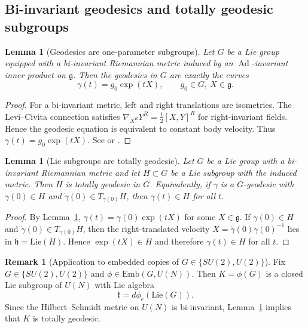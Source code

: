 \documentclass{article}%
\newtheorem{lemma}[theorem]{Lemma}
\theoremstyle{definition}
\newtheorem{remark}[theorem]{Remark}
\numberwithin{equation}{section}
\newcommand{\Emb}{\mathrm{Emb}}
\newcommand{\Lie}{\mathrm{Lie}}
\DeclareMathOperator{\Ad}{Ad}
\begin{document}
\subsection{Bi-invariant geodesics and totally geodesic subgroups}
\label{subsec:geodesics_and_totally_geodesic}

\begin{lemma}[Geodesics are one-parameter subgroups]\label{lem:geodesics_one_parameter}
Let $G$ be a Lie group equipped with a bi-invariant Riemannian metric induced by an $\Ad$-invariant inner product on $\mathfrak g$.
Then the geodesics in $G$ are exactly the curves
\[
\gamma(t)=g_0\exp(tX),\qquad g_0\in G,\ X\in\mathfrak g.
\]
\end{lemma}

\begin{proof}
For a bi-invariant metric, left and right translations are isometries.
The Levi--Civita connection satisfies $\nabla_{X^R}Y^R=\tfrac12[X,Y]^R$ for right-invariant fields.
Hence the geodesic equation is equivalent to constant body velocity.
Thus $\gamma(t)=g_0\exp(tX)$. See \cite[Ch.~4]{Hall2015} or \cite[\S~II.1]{Knapp2002}.
\end{proof}

\begin{lemma}[Lie subgroups are totally geodesic]\label{lem:embedded_subgroup_totally_geodesic}
Let $G$ be a Lie group with a bi-invariant Riemannian metric and let $H\subset G$ be a Lie subgroup with the induced metric.
Then $H$ is totally geodesic in $G$.
Equivalently, if $\gamma$ is a $G$-geodesic with $\gamma(0)\in H$ and $\dot\gamma(0)\in T_{\gamma(0)}H$, then $\gamma(t)\in H$ for all $t$.
\end{lemma}

\begin{proof}
By Lemma~\ref{lem:geodesics_one_parameter}, $\gamma(t)=\gamma(0)\exp(tX)$ for some $X\in\mathfrak g$.
If $\gamma(0)\in H$ and $\dot\gamma(0)\in T_{\gamma(0)}H$, then the right-translated velocity $X=\dot\gamma(0)\gamma(0)^{-1}$
lies in $\mathfrak h=\Lie(H)$. Hence $\exp(tX)\in H$ and therefore $\gamma(t)\in H$ for all $t$.
\end{proof}

\begin{remark}[Application to embedded copies of $G\in\{SU(2),U(2)\}$]
\label{rem:totally_geodesic_embedded_SU2}
Fix $G\in\{SU(2),U(2)\}$ and $\phi\in\Emb(G,U(N))$. Then $K=\phi(G)$ is a closed Lie subgroup of $U(N)$ with Lie algebra
\[
\mathfrak{k}=d\phi_e(\Lie(G)).
\]
Since the Hilbert--Schmidt metric on $U(N)$ is bi-invariant, Lemma~\ref{lem:embedded_subgroup_totally_geodesic} implies that $K$ is
totally geodesic.
\end{remark}
\end{document}
